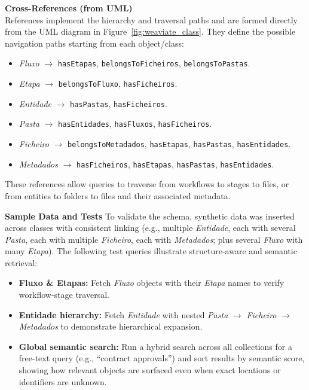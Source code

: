 \noindent\textbf{Cross-References (from UML)}\\
References implement the hierarchy and traversal paths and are formed directly from the UML diagram in Figure~\ref{fig:weaviate_class}. They define the possible navigation paths starting from each object/class:
\begin{itemize}
    \item \textit{Fluxo} \(\rightarrow\) \texttt{hasEtapas}, \texttt{belongsToFicheiros}, \texttt{belongsToPastas}.
    \item \textit{Etapa} \(\rightarrow\) \texttt{belongsToFluxo}, \texttt{hasFicheiros}.
    \item \textit{Entidade} \(\rightarrow\) \texttt{hasPastas}, \texttt{hasFicheiros}.
    \item \textit{Pasta} \(\rightarrow\) \texttt{hasEntidades}, \texttt{hasFluxos}, \texttt{hasFicheiros}.
    \item \textit{Ficheiro} \(\rightarrow\) \texttt{belongsToMetadados}, \texttt{hasEtapas}, \texttt{hasPastas}, \texttt{hasEntidades}.
    \item \textit{Metadados} \(\rightarrow\) \texttt{hasFicheiros}, \texttt{hasEtapas}, \texttt{hasPastas}, \texttt{hasEntidades}.
\end{itemize}
These references allow queries to traverse from workflows to stages to files, or from entities to folders to files and their associated metadata.

\noindent\textbf{Sample Data and Tests}
To validate the schema, synthetic data was inserted across classes with consistent linking (e.g., multiple \textit{Entidade}, each with several \textit{Pasta}, each with multiple \textit{Ficheiro}, each with \textit{Metadados}; plus several \textit{Fluxo} with many \textit{Etapa}). The following test queries illustrate structure-aware and semantic retrieval:
\begin{itemize}
    \item \textbf{Fluxo \& Etapas:} Fetch \textit{Fluxo} objects with their \textit{Etapa} names to verify workflow-stage traversal.
    \item \textbf{Entidade hierarchy:} Fetch \textit{Entidade} with nested \textit{Pasta} \(\rightarrow\) \textit{Ficheiro} \(\rightarrow\) \textit{Metadados} to demonstrate hierarchical expansion.
    \item \textbf{Global semantic search:} Run a hybrid search across all collections for a free-text query (e.g., “contract approvals”) and sort results by semantic score, showing how relevant objects are surfaced even when exact locations or identifiers are unknown.
\end{itemize}

